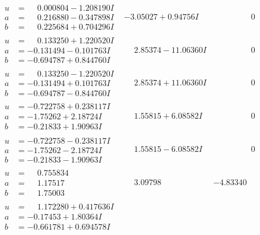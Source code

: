 \documentclass[1p]{elsarticle_modified}
\theoremstyle{definition}
\begin{document}
$$\begin{array}{c|c|c}
\begin{aligned}
u &= \phantom{-}0.000804 - 1.208190 I \\
a &= \phantom{-}0.216880 - 0.347898 I \\
b &= \phantom{-}0.225684 + 0.704296 I\end{aligned}
 & -3.05027 + 0.94756 I & \phantom{-0.000000 } 0 \\ \hline\begin{aligned}
u &= \phantom{-}0.133250 + 1.220520 I \\
a &= -0.131494 - 0.101763 I \\
b &= -0.694787 + 0.844760 I\end{aligned}
 & \phantom{-}2.85374 - 11.06360 I & \phantom{-0.000000 } 0 \\ \hline\begin{aligned}
u &= \phantom{-}0.133250 - 1.220520 I \\
a &= -0.131494 + 0.101763 I \\
b &= -0.694787 - 0.844760 I\end{aligned}
 & \phantom{-}2.85374 + 11.06360 I & \phantom{-0.000000 } 0 \\ \hline\begin{aligned}
u &= -0.722758 + 0.238117 I \\
a &= -1.75262 + 2.18724 I \\
b &= -0.21833 + 1.90963 I\end{aligned}
 & \phantom{-}1.55815 + 6.08582 I & \phantom{-0.000000 } 0 \\ \hline\begin{aligned}
u &= -0.722758 - 0.238117 I \\
a &= -1.75262 - 2.18724 I \\
b &= -0.21833 - 1.90963 I\end{aligned}
 & \phantom{-}1.55815 - 6.08582 I & \phantom{-0.000000 } 0 \\ \hline\begin{aligned}
u &= \phantom{-}0.755834\phantom{ +0.000000I} \\
a &= \phantom{-}1.17517\phantom{ +0.000000I} \\
b &= \phantom{-}1.75003\phantom{ +0.000000I}\end{aligned}
 & \phantom{-}3.09798\phantom{ +0.000000I} & -4.83340\phantom{ +0.000000I} \\ \hline\begin{aligned}
u &= \phantom{-}1.172280 + 0.417636 I \\
a &= -0.17453 + 1.80364 I \\
b &= -0.661781 + 0.694578 I\end{aligned}

\end{array}$$
\end{document}

